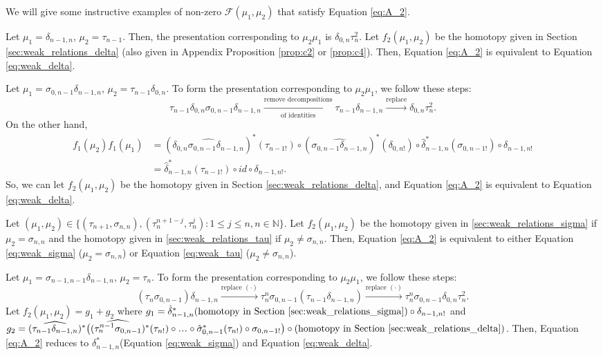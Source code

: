 We will give some instructive examples 
of non-zero $\mathcal{F}(\mu_1, \mu_2)$ that satisfy Equation 
\ref{eq:A_2}.
\begin{eg}
Let $\mu_1 = \delta_{n-1,n}$, $\mu_2 = 
\tau_{n-1}$. Then, the presentation 
corresponding to $\mu_2\mu_1$ is 
$\delta_{0,n}\tau_n^2$. Let 
$f_2(\mu_1, \mu_2)$ be the homotopy given 
in Section \ref{sec:weak_relations_delta} 
(also given in Appendix Proposition 
\ref{prop:c2} or \ref{prop:c4}). 
Then, Equation \ref{eq:A_2} 
is equivalent to Equation \ref{eq:weak_delta}.
\end{eg}
%
\begin{eg}
Let $\mu_1 = \sigma_{0,n-1} \delta_{n-1,n}$, 
$\mu_2 = \tau_{n-1} \delta_{0,n}$. To 
form the presentation corresponding to 
$\mu_2\mu_1$, we follow these steps: 
$$
\tau_{n-1} \delta_{0,n} \sigma_{0,n-1} 
\delta_{n-1,n} 
\xrightarrow[\textrm{of identities}]{\textrm{remove decompositions}}
\tau_{n-1} \delta_{n-1,n}
\xrightarrow{\textrm{replace}}
\delta_{0,n}\tau_n^2.
$$
On the other hand, 
\begin{align*}
f_1(\mu_2)f_1(\mu_1) 
&= 
(\widehat{\delta_{0,n}\sigma_{0,n-1}
  \delta_{n-1,n}})^*(\tau_{n-1!}) \circ
  (\widehat{\sigma_{0,n-1}\delta_{n-1,n}})^*
  (\delta_{0,n!}) \circ 
  \hat{\delta}_{n-1,n}^*(\sigma_{0,n-1!}) 
  \circ \delta_{n-1,n!}\\
&= 
\hat{\delta}_{n-1,n}^*(\tau_{n-1!}) \circ
  id \circ \delta_{n-1,n!}.
\end{align*}
So, we can let $f_2(\mu_1, \mu_2)$ be the 
homotopy given in Section 
\ref{sec:weak_relations_delta}, and Equation 
\ref{eq:A_2} is equivalent to Equation 
\ref{eq:weak_delta}.
\end{eg}
%
\begin{eg}
Let $(\mu_1, \mu_2) \in \{ (\tau_{n+1}, 
\sigma_{n,n}), (\tau_{n}^{n+1-j}, 
\tau_n^j): 1\leq j \leq n, n \in \mathbb{N}
\}$. Let $f_2(\mu_1, \mu_2)$ be 
the homotopy given in 
\ref{sec:weak_relations_sigma} if $\mu_2 = 
\sigma_{n,n}$ and the homotopy given in 
\ref{sec:weak_relations_tau} if $\mu_2 \neq 
\sigma_{n,n}$. Then, Equation \ref{eq:A_2} 
is equivalent to either Equation 
\ref{eq:weak_sigma} ($\mu_2 = 
\sigma_{n,n}$) or Equation \ref{eq:weak_tau} 
($\mu_2 \neq \sigma_{n,n}$).
\end{eg}
%
\begin{eg}
Let $\mu_1 = \sigma_{n-1,n-1} \delta_{n-1,n}$, 
$\mu_2 = \tau_n$. To 
form the presentation corresponding to 
$\mu_2\mu_1$, we follow these steps: 
$$
(\tau_n \sigma_{0,n-1}) 
\delta_{n-1,n} 
\xrightarrow{\textrm{replace $(\cdot)$}}
\tau_n^n \sigma_{0,n-1}(\tau_{n-1}\delta_{n-1,n})
\xrightarrow{\textrm{replace $(\cdot)$}}
\tau_n^n \sigma_{0,n-1}\delta_{0,n}\tau_n^2.
$$
Let $f_2(\mu_1, \mu_2) = g_1 + g_2$ where 
$g_1 = \hat{\delta}_{n-1,n}^*( 
\textrm{homotopy in Section 
\ref{sec:weak_relations_sigma}})\circ
\delta_{n-1,n!}$ and $g_2 = 
(\widehat{\tau_{n-1}\delta_{n-1,n}})^*\big(
(\widehat{\tau_n^{n-1}\sigma_{0,n-1}})^*
  (\tau_{n!}) \circ \smdots \circ 
  \hat{\sigma}_{0,n-1}^*(\tau_{n!}) \circ 
  \sigma_{0,n-1!} \big) \circ 
\textrm{(homotopy in Section 
\ref{sec:weak_relations_delta})}$. 
Then, Equation \ref{eq:A_2} 
reduces to $\delta_{n-1,n}^*$(Equation 
\ref{eq:weak_sigma}) and Equation 
\ref{eq:weak_delta}.
\end{eg}
%